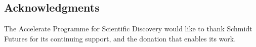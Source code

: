 \documentclass[a4paper,UKenglish]{dagrep-v2018}
\begin{document}




\subsection*{Acknowledgments}

The Accelerate Programme for Scientific Discovery would like to thank
Schmidt Futures for its continuing support, and the donation that
enables its work.


\printbibliography

\appendix


\end{document}
